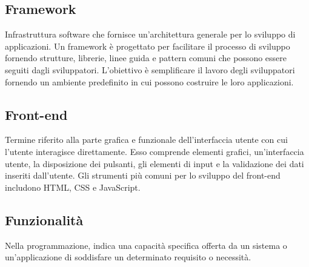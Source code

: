 \hypertarget{sec:framework}{}
\subsection*{Framework}
Infrastruttura software che fornisce un’architettura generale per lo sviluppo di applicazioni. Un framework è progettato per facilitare il processo di 
sviluppo fornendo strutture, librerie, linee guida e pattern comuni che possono essere seguiti dagli sviluppatori. L’obiettivo è semplificare il lavoro 
degli sviluppatori fornendo un ambiente predefinito in cui possono costruire le loro applicazioni.

\hypertarget{sec:front-end}{}
\subsection*{Front-end}
Termine riferito alla parte grafica e funzionale dell’interfaccia utente con cui l’utente interagisce direttamente. 
Esso comprende elementi grafici, un’interfaccia utente, la disposizione dei pulsanti, gli elementi di input e la 
validazione dei dati inseriti dall’utente. Gli strumenti più comuni per lo sviluppo del front-end includono HTML, 
CSS e JavaScript.

\hypertarget{sec:funzionalità}{}
\subsection*{Funzionalità}
Nella programmazione, indica una capacità specifica offerta da un sistema o un'applicazione di soddisfare un determinato requisito o necessità.

\newpage